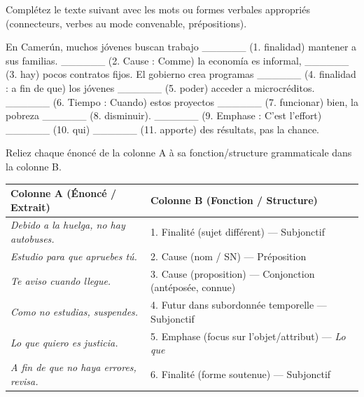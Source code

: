 \documentclass[11pt]{article}
\newcounter{popsec}
\newcounter{popsub}
\newcommand{\courssub}[1]{%
  \stepcounter{popsub}%
  \par\vspace{9pt}\noindent{\popxbold\fontsize{11.5}{13}\selectfont\color{popink}{\color{poporange}\thepopsec.\thepopsub}\hspace{6pt}#1}\par\nopagebreak\vspace{4pt}
}
\newcommand{\esp}[1]{\ifmmode\text{\textit{#1}}\else\begingroup\selectlanguage{spanish}\itshape #1\endgroup\fi}
\begin{document}
\begin{exercice}
Complétez le texte suivant avec les mots ou formes verbales appropriés (connecteurs, verbes au mode convenable, prépositions).
\begin{textebox}
En Camerún, muchos jóvenes buscan trabajo \_\_\_\_\_\_ (1. finalidad) mantener a sus familias. \_\_\_\_\_\_ (2. Cause : Comme) la economía es informal, \_\_\_\_\_\_ (3. hay) pocos contratos fijos. El gobierno crea programas \_\_\_\_\_\_ (4. finalidad : a fin de que) los jóvenes \_\_\_\_\_\_ (5. poder) acceder a microcréditos. \_\_\_\_\_\_ (6. Tiempo : Cuando) estos proyectos \_\_\_\_\_\_ (7. funcionar) bien, la pobreza \_\_\_\_\_\_ (8. disminuir). \_\_\_\_\_\_ (9. Emphase : C'est l'effort) \_\_\_\_\_\_ (10. qui) \_\_\_\_\_\_ (11. apporte) des résultats, pas la chance.
\end{textebox}
\end{exercice}

\begin{exercice}
Reliez chaque énoncé de la colonne A à sa fonction/structure grammaticale dans la colonne B.
\begin{center}
\begin{tabularx}{\linewidth}{|X|X|}
\hline
\textbf{Colonne A (Énoncé / Extrait)} & \textbf{Colonne B (Fonction / Structure)} \\
\hline
\esp{Debido a la huelga, no hay autobuses.} & 1. Finalité (sujet différent) — Subjonctif \\
\hline
\esp{Estudio para que apruebes tú.} & 2. Cause (nom / SN) — Préposition \\
\hline
\esp{Te aviso cuando llegue.} & 3. Cause (proposition) — Conjonction (antéposée, connue) \\
\hline
\esp{Como no estudias, suspendes.} & 4. Futur dans subordonnée temporelle — Subjonctif \\
\hline
\esp{Lo que quiero es justicia.} & 5. Emphase (focus sur l'objet/attribut) — \esp{Lo que} \\
\hline
\esp{A fin de que no haya errores, revisa.} & 6. Finalité (forme soutenue) — Subjonctif \\
\hline
\end{tabularx}
\end{center}
\end{exercice}

\courssub{Je me prépare au Bac}
\end{document}
